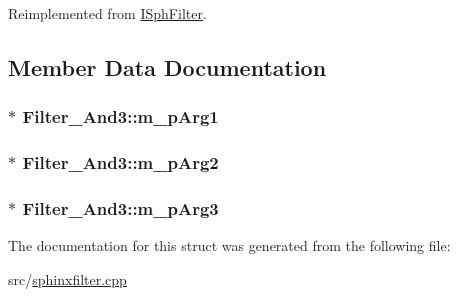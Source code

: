 Reimplemented from \hyperlink{structISphFilter_a90e305bb9949cebb91a7f7d038e6789a}{I\-Sph\-Filter}.



\subsection{Member Data Documentation}
\hypertarget{structFilter__And3_ad58334e14938dc62f48cb4cebe292116}{
\subsubsection[{m\-\_\-p\-Arg1}]{$\ast$ Filter\-\_\-\-And3\-::m\-\_\-p\-Arg1}}\label{structFilter__And3_ad58334e14938dc62f48cb4cebe292116}
\hypertarget{structFilter__And3_a7b0412cd436358c7de03578dd4ad4355}{
\subsubsection[{m\-\_\-p\-Arg2}]{$\ast$ Filter\-\_\-\-And3\-::m\-\_\-p\-Arg2}}\label{structFilter__And3_a7b0412cd436358c7de03578dd4ad4355}
\hypertarget{structFilter__And3_a36ad3b0c78d3420a3688d2a6ebd47861}{
\subsubsection[{m\-\_\-p\-Arg3}]{$\ast$ Filter\-\_\-\-And3\-::m\-\_\-p\-Arg3}}\label{structFilter__And3_a36ad3b0c78d3420a3688d2a6ebd47861}


The documentation for this struct was generated from the following file\-:\begin{DoxyCompactItemize}
\item 
src/\hyperlink{sphinxfilter_8cpp}{sphinxfilter.\-cpp}\end{DoxyCompactItemize}
